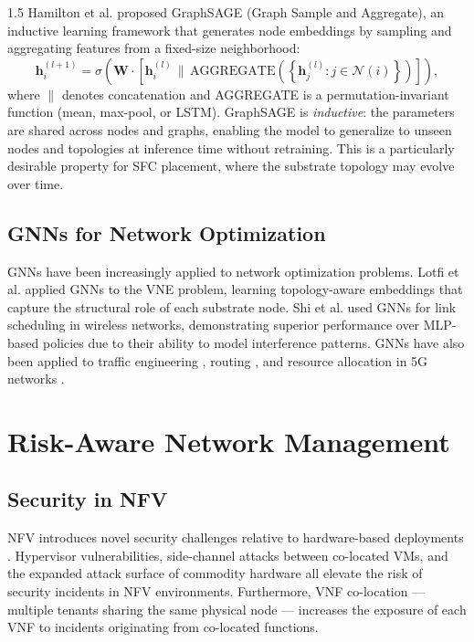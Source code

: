 \documentclass[A4paper,12pt]{report}
\theoremstyle{plain}
\theoremstyle{definition}
\theoremstyle{remark}
\numberwithin{equation}{section}
\begin{document}
\begin{spacing}{1.5}
Hamilton et al. \cite{hamilton2017} proposed GraphSAGE (Graph Sample and Aggregate), an inductive learning framework that generates node embeddings by sampling and aggregating features from a fixed-size neighborhood:
\begin{equation}
\mathbf{h}_i^{(l+1)} = \sigma\!\left(\mathbf{W} \cdot \left[\mathbf{h}_i^{(l)} \,\|\, \text{AGGREGATE}\!\left(\left\{\mathbf{h}_j^{(l)} : j \in \mathcal{N}(i)\right\}\right)\right]\right),
\end{equation}
where $\|$ denotes concatenation and AGGREGATE is a permutation-invariant function (mean, max-pool, or LSTM). GraphSAGE is \textit{inductive}: the parameters are shared across nodes and graphs, enabling the model to generalize to unseen nodes and topologies at inference time without retraining. This is a particularly desirable property for SFC placement, where the substrate topology may evolve over time.

\subsection{GNNs for Network Optimization}

GNNs have been increasingly applied to network optimization problems. Lotfi et al. \cite{lotfi2022} applied GNNs to the VNE problem, learning topology-aware embeddings that capture the structural role of each substrate node. Shi et al. \cite{shi2021} used GNNs for link scheduling in wireless networks, demonstrating superior performance over MLP-based policies due to their ability to model interference patterns. GNNs have also been applied to traffic engineering \cite{rusek2020}, routing \cite{almasan2019}, and resource allocation in 5G networks \cite{guo2021}.

\section{Risk-Aware Network Management}

\subsection{Security in NFV}

NFV introduces novel security challenges relative to hardware-based deployments \cite{pattaranantakul2016}. Hypervisor vulnerabilities, side-channel attacks between co-located VMs, and the expanded attack surface of commodity hardware all elevate the risk of security incidents in NFV environments. Furthermore, VNF co-location — multiple tenants sharing the same physical node — increases the exposure of each VNF to incidents originating from co-located functions.


\end{spacing}
\end{document}
